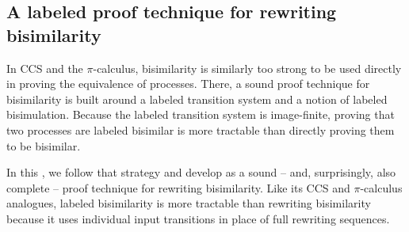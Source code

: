 

\subsection{A labeled proof technique for rewriting bisimilarity}\label{sec:ordered-bisimilarity:labeled-bisim}

In \ac{CCS} and the $\pi$-calculus, bisimilarity is similarly too strong to be used directly in proving the equivalence of processes.
There, a sound proof technique for bisimilarity is built around a labeled transition system and a notion of labeled bisimulation.\autocite{Sangiorgi+Walker:CUP03}
Because the labeled transition system is image-finite, proving that two processes are labeled bisimilar is more tractable than directly proving them to be bisimilar.

In this , we follow that strategy and develop  as a sound -- and, surprisingly, also complete -- proof technique for rewriting bisimilarity.
Like its \ac{CCS} and $\pi$-calculus analogues, labeled bisimilarity is more tractable than rewriting bisimilarity because it uses individual input transitions in place of full rewriting sequences.

